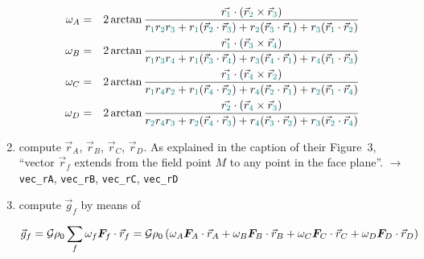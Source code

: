 \begin{enumerate}
\begin{eqnarray}
\omega_A &=& 
2 \arctan \frac{\vec{r_{\color{teal}1}} \cdot (\vec{r}_{\color{teal}2} \times \vec{r}_{\color{teal}3})}{r_{\color{teal}1}r_{\color{teal}2}r_{\color{teal}3} 
+r_{\color{teal}1}(\vec{r}_{\color{teal}2}\cdot\vec{r}_{\color{teal}3}) 
+r_{\color{teal}2}(\vec{r}_{\color{teal}3}\cdot\vec{r}_{\color{teal}1}) 
+r_{\color{teal}3}(\vec{r}_{\color{teal}1}\cdot\vec{r}_{\color{teal}2})  } \nonumber\\
\omega_B &=& 
2 \arctan \frac{\vec{r_{\color{teal}1}} \cdot (\vec{r}_{\color{teal}3} \times \vec{r}_{\color{teal}4})}{r_{\color{teal}1}r_{\color{teal}3}r_{\color{teal}4} 
+r_{\color{teal}1}(\vec{r}_{\color{teal}3}\cdot\vec{r}_{\color{teal}4}) 
+r_{\color{teal}3}(\vec{r}_{\color{teal}4}\cdot\vec{r}_{\color{teal}1}) 
+r_{\color{teal}4}(\vec{r}_{\color{teal}1}\cdot\vec{r}_{\color{teal}3})  } \nonumber\\
\omega_C &=&
2 \arctan \frac{\vec{r_{\color{teal}1}} \cdot (\vec{r}_{\color{teal}4} \times \vec{r}_{\color{teal}2})}{r_{\color{teal}1}r_{\color{teal}4}r_{\color{teal}2}
+r_{\color{teal}1}(\vec{r}_{\color{teal}4}\cdot\vec{r}_{\color{teal}2}) 
+r_{\color{teal}4}(\vec{r}_{\color{teal}2}\cdot\vec{r}_{\color{teal}1}) 
+r_{\color{teal}2}(\vec{r}_{\color{teal}1}\cdot\vec{r}_{\color{teal}4}) 
} \nonumber\\
\omega_D &=&
2 \arctan \frac{\vec{r_{\color{teal}2}} \cdot (\vec{r}_{\color{teal}4} \times \vec{r}_{\color{teal}3})}{r_{\color{teal}2}r_{\color{teal}4}r_{\color{teal}3} 
+r_{\color{teal}2}(\vec{r}_{\color{teal}4}\cdot\vec{r}_{\color{teal}3}) 
+r_{\color{teal}4}(\vec{r}_{\color{teal}3}\cdot\vec{r}_{\color{teal}2}) 
+r_{\color{teal}3}(\vec{r}_{\color{teal}2}\cdot\vec{r}_{\color{teal}4}) 
}
\end{eqnarray}


\item compute $\vec{r}_{A}$, $\vec{r}_{B}$, $\vec{r}_{C}$, $\vec{r}_{D}$.
As explained in the caption of their Figure~3, ``vector $\vec{r}_f$
extends from the field point $M$ to any point in the face plane''.
$\rightarrow$ \verb|vec_rA|, \verb|vec_rB|, \verb|vec_rC|, \verb|vec_rD|

\item compute $\vec{g}_f$ by means of %

\[
\vec{g}_f
= {\cal G} \rho_0 \sum_f \omega_f {\bm F}_f\cdot \vec{r}_f 
= {\cal G} \rho_0 \left(
\omega_A {\bm F}_A\cdot \vec{r}_A +
\omega_B {\bm F}_B\cdot \vec{r}_B +
\omega_C {\bm F}_C\cdot \vec{r}_C +
\omega_D {\bm F}_D\cdot \vec{r}_D 
\right)
\]





\end{enumerate}
